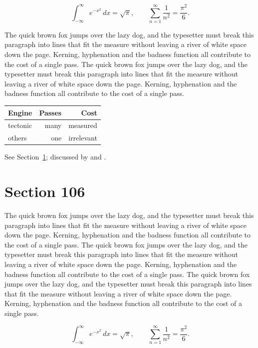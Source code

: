 \documentclass{article}
\begin{document}
\begin{equation}\label{eq:105}
\int_{-\infty}^{\infty} e^{-x^{2}}\,dx = \sqrt{\pi}, \qquad
\sum_{n=1}^{\infty} \frac{1}{n^{2}} = \frac{\pi^{2}}{6}.
\end{equation}

The quick brown fox jumps over the lazy dog, and the typesetter must break this paragraph into lines that fit the measure without leaving a river of white space down the page. Kerning, hyphenation and the badness function all contribute to the cost of a single pass. The quick brown fox jumps over the lazy dog, and the typesetter must break this paragraph into lines that fit the measure without leaving a river of white space down the page. Kerning, hyphenation and the badness function all contribute to the cost of a single pass. 

\begin{center}
\begin{tabular}{lrr}
\toprule
Engine & Passes & Cost \\
\midrule
tectonic & many & measured \\
others & one & irrelevant \\
\bottomrule
\end{tabular}
\end{center}

See Section~\ref{sec:106}; discussed by \textcite{k1} and \textcite{l3}.
\section{Section 106}
\label{sec:106}
The quick brown fox jumps over the lazy dog, and the typesetter must break this paragraph into lines that fit the measure without leaving a river of white space down the page. Kerning, hyphenation and the badness function all contribute to the cost of a single pass. The quick brown fox jumps over the lazy dog, and the typesetter must break this paragraph into lines that fit the measure without leaving a river of white space down the page. Kerning, hyphenation and the badness function all contribute to the cost of a single pass. The quick brown fox jumps over the lazy dog, and the typesetter must break this paragraph into lines that fit the measure without leaving a river of white space down the page. Kerning, hyphenation and the badness function all contribute to the cost of a single pass. 

\begin{equation}\label{eq:106}
\int_{-\infty}^{\infty} e^{-x^{2}}\,dx = \sqrt{\pi}, \qquad
\sum_{n=1}^{\infty} \frac{1}{n^{2}} = \frac{\pi^{2}}{6}.
\end{equation}
\end{document}
